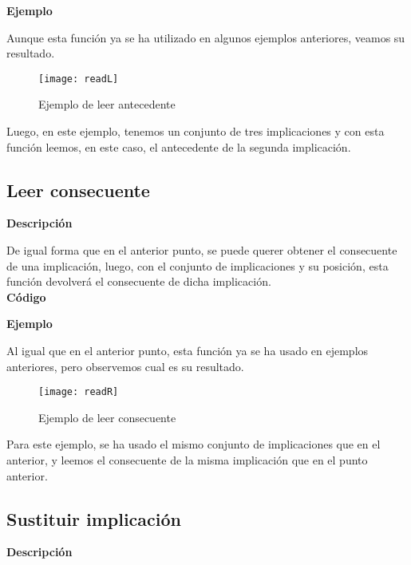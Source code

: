     \textbf{Ejemplo}

    Aunque esta funci\'on ya se ha utilizado en algunos ejemplos anteriores, veamos su resultado.

    \begin{figure}[H]
        \centering
        \texttt{[image: readL]}
        \caption{Ejemplo de leer antecedente}
        \label{fig:readL}
    \end{figure}

    Luego, en este ejemplo, tenemos un conjunto de tres implicaciones y con esta funci\'on leemos, en este caso, el antecedente de 
    la segunda implicaci\'on. 



\subsection{Leer consecuente}

    \textbf{Descripci\'on}
    
    De igual forma que en el anterior punto, se puede querer obtener el consecuente de una implicaci\'on, luego, con el conjunto de 
    implicaciones y su posici\'on, esta funci\'on devolver\'a el consecuente de dicha implicaci\'on.
    \\


    \textbf{C\'odigo}

    
    \bigskip

    \textbf{Ejemplo}

    Al igual que en el anterior punto, esta funci\'on ya se ha usado en ejemplos anteriores, pero observemos cual es su resultado.

    \begin{figure}[H]
        \centering
        \texttt{[image: readR]}
        \caption{Ejemplo de leer consecuente}
        \label{fig:readR}
    \end{figure}

    Para este ejemplo, se ha usado el mismo conjunto de implicaciones que en el anterior, y leemos el consecuente de la misma 
    implicaci\'on que en el punto anterior.

    \clearpage

\subsection{Sustituir implicaci\'on}

    \textbf{Descripci\'on}

